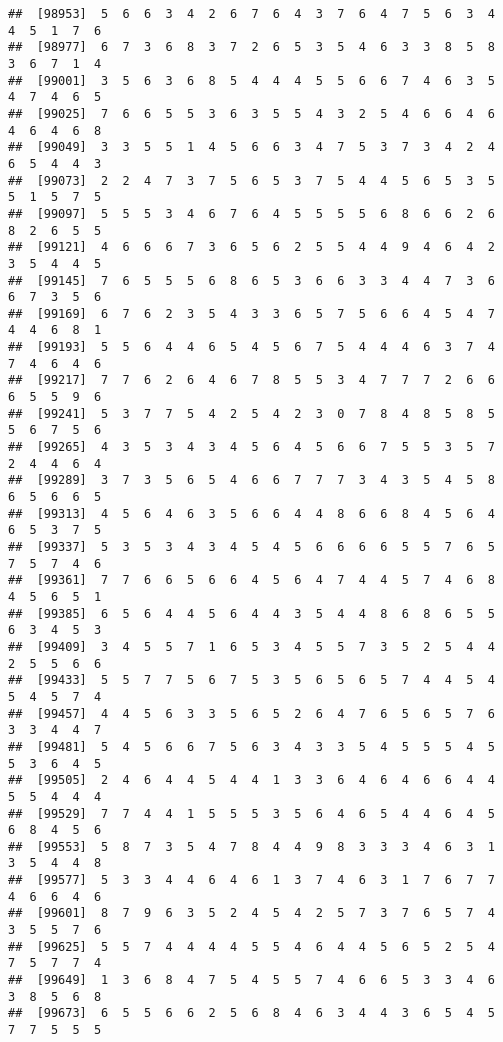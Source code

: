 \documentclass[
]{book}
\begin{document}
\begin{verbatim}
##  [98953]  5  6  6  3  4  2  6  7  6  4  3  7  6  4  7  5  6  3  4  4  5  1  7  6
##  [98977]  6  7  3  6  8  3  7  2  6  5  3  5  4  6  3  3  8  5  8  3  6  7  1  4
##  [99001]  3  5  6  3  6  8  5  4  4  4  5  5  6  6  7  4  6  3  5  4  7  4  6  5
##  [99025]  7  6  6  5  5  3  6  3  5  5  4  3  2  5  4  6  6  4  6  4  6  4  6  8
##  [99049]  3  3  5  5  1  4  5  6  6  3  4  7  5  3  7  3  4  2  4  6  5  4  4  3
##  [99073]  2  2  4  7  3  7  5  6  5  3  7  5  4  4  5  6  5  3  5  5  1  5  7  5
##  [99097]  5  5  5  3  4  6  7  6  4  5  5  5  5  6  8  6  6  2  6  8  2  6  5  5
##  [99121]  4  6  6  6  7  3  6  5  6  2  5  5  4  4  9  4  6  4  2  3  5  4  4  5
##  [99145]  7  6  5  5  5  6  8  6  5  3  6  6  3  3  4  4  7  3  6  6  7  3  5  6
##  [99169]  6  7  6  2  3  5  4  3  3  6  5  7  5  6  6  4  5  4  7  4  4  6  8  1
##  [99193]  5  5  6  4  4  6  5  4  5  6  7  5  4  4  4  6  3  7  4  7  4  6  4  6
##  [99217]  7  7  6  2  6  4  6  7  8  5  5  3  4  7  7  7  2  6  6  6  5  5  9  6
##  [99241]  5  3  7  7  5  4  2  5  4  2  3  0  7  8  4  8  5  8  5  5  6  7  5  6
##  [99265]  4  3  5  3  4  3  4  5  6  4  5  6  6  7  5  5  3  5  7  2  4  4  6  4
##  [99289]  3  7  3  5  6  5  4  6  6  7  7  7  3  4  3  5  4  5  8  6  5  6  6  5
##  [99313]  4  5  6  4  6  3  5  6  6  4  4  8  6  6  8  4  5  6  4  6  5  3  7  5
##  [99337]  5  3  5  3  4  3  4  5  4  5  6  6  6  6  5  5  7  6  5  7  5  7  4  6
##  [99361]  7  7  6  6  5  6  6  4  5  6  4  7  4  4  5  7  4  6  8  4  5  6  5  1
##  [99385]  6  5  6  4  4  5  6  4  4  3  5  4  4  8  6  8  6  5  5  6  3  4  5  3
##  [99409]  3  4  5  5  7  1  6  5  3  4  5  5  7  3  5  2  5  4  4  2  5  5  6  6
##  [99433]  5  5  7  7  5  6  7  5  3  5  6  5  6  5  7  4  4  5  4  5  4  5  7  4
##  [99457]  4  4  5  6  3  3  5  6  5  2  6  4  7  6  5  6  5  7  6  3  3  4  4  7
##  [99481]  5  4  5  6  6  7  5  6  3  4  3  3  5  4  5  5  5  4  5  5  3  6  4  5
##  [99505]  2  4  6  4  4  5  4  4  1  3  3  6  4  6  4  6  6  4  4  5  5  4  4  4
##  [99529]  7  7  4  4  1  5  5  5  3  5  6  4  6  5  4  4  6  4  5  6  8  4  5  6
##  [99553]  5  8  7  3  5  4  7  8  4  4  9  8  3  3  3  4  6  3  1  3  5  4  4  8
##  [99577]  5  3  3  4  4  6  4  6  1  3  7  4  6  3  1  7  6  7  7  4  6  6  4  6
##  [99601]  8  7  9  6  3  5  2  4  5  4  2  5  7  3  7  6  5  7  4  3  5  5  7  6
##  [99625]  5  5  7  4  4  4  4  5  5  4  6  4  4  5  6  5  2  5  4  7  5  7  7  4
##  [99649]  1  3  6  8  4  7  5  4  5  5  7  4  6  6  5  3  3  4  6  3  8  5  6  8
##  [99673]  6  5  5  6  6  2  5  6  8  4  6  3  4  4  3  6  5  4  5  7  7  5  5  5

\end{verbatim}
\end{document}
